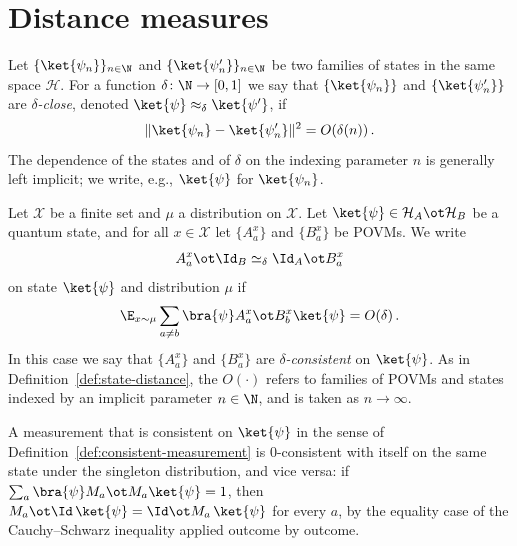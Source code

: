\section{Distance measures}

\begin{definition}\label{def:state-distance}
	Let $\{\ket{\psi_n}\}_{n \in \N}$ and $\{\ket{\psi'_n}\}_{n \in \N}$ be two families of states in the same space $\mathcal H$. For a function $\delta \colon \N \to [0,1]$ we say that $\{\ket{\psi_n}\}$ and $\{\ket{\psi'_n}\}$ are \emph{$\delta$-close}, denoted $\ket{\psi} \approx_\delta \ket{\psi'}$, if
	\[
		\lVert \ket{\psi_n} - \ket{\psi'_n} \rVert^2 = O(\delta(n))\,.
	\]
	The dependence of the states and of $\delta$ on the indexing parameter $n$ is generally left implicit; we write, e.g., $\ket{\psi}$ for $\ket{\psi_n}$.
\end{definition}

\begin{definition}\label{def:consistency}
	\leanok
	Let $\mathcal X$ be a finite set and $\mu$ a distribution on $\mathcal X$. Let $\ket{\psi} \in \mathcal H_A \ot \mathcal H_B$ be a quantum state, and for all $x \in \mathcal X$ let $\{A^x_a\}$ and $\{B^x_a\}$ be POVMs. We write
	\[
		A^x_a \ot \Id_B \simeq_\delta \Id_A \ot B^x_a
	\]
	on state $\ket{\psi}$ and distribution $\mu$ if
	\[
		\E_{x \sim \mu} \sum_{a \ne b} \bra{\psi} A^x_a \ot B^x_b \ket{\psi} = O(\delta)\,.
	\]
	In this case we say that $\{A^x_a\}$ and $\{B^x_a\}$ are \emph{$\delta$-consistent} on $\ket{\psi}$. As in Definition~\ref{def:state-distance}, the $O(\cdot)$ refers to families of POVMs and states indexed by an implicit parameter $n \in \N$, and is taken as $n \to \infty$.
\end{definition}

A measurement that is consistent on $\ket{\psi}$ in the sense of Definition~\ref{def:consistent-measurement} is $0$-consistent with itself on the same state under the singleton distribution, and vice versa: if $\sum_a \bra{\psi} M_a \ot M_a \ket{\psi} = 1$, then $M_a \ot \Id\, \ket{\psi} = \Id \ot M_a\, \ket{\psi}$ for every $a$, by the equality case of the Cauchy--Schwarz inequality applied outcome by outcome.

